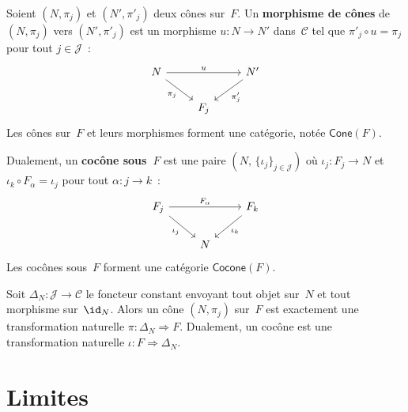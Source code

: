\begin{definition}\label{def:morphisme-cone}
Soient $(N,\pi_j)$ et $(N',\pi'_j)$ deux cônes sur~$F$.
Un \textbf{morphisme de cônes} de $(N,\pi_j)$ vers $(N',\pi'_j)$
est un morphisme $u\colon N\to N'$ dans~$\mathcal{C}$ tel que
$\pi'_j \circ u = \pi_j$ pour tout $j\in\mathcal{J}$~:
\[
\begin{tikzcd}
N \arrow[rr, "u"] \arrow[dr, "\pi_j"'] && N' \arrow[dl, "\pi'_j"] \\
& F_j &
\end{tikzcd}
\]
Les cônes sur~$F$ et leurs morphismes forment une catégorie,
notée $\mathsf{Cone}(F)$.
\end{definition}

\begin{definition}[Cocône]\label{def:cocone}
Dualement, un \textbf{cocône sous~$F$} est une paire
$(N,\,\{\iota_j\}_{j\in\mathcal{J}})$ où $\iota_j\colon F_j\to N$
et $\iota_k \circ F_\alpha = \iota_j$ pour tout $\alpha\colon j\to k$~:
\[
\begin{tikzcd}
F_j \arrow[rr, "F_\alpha"] \arrow[dr, "\iota_j"'] & & F_k \arrow[dl, "\iota_k"] \\
& N &
\end{tikzcd}
\]
Les cocônes sous~$F$ forment une catégorie $\mathsf{Cocone}(F)$.
\end{definition}

\begin{remarque}\label{rem:cone-transfo-nat}
Soit $\Delta_N \colon \mathcal{J}\to\mathcal{C}$ le foncteur constant
envoyant tout objet sur~$N$ et tout morphisme sur~$\id_N$.
Alors un cône $(N,\pi_j)$ sur~$F$ est exactement une transformation naturelle
$\pi\colon \Delta_N \Rightarrow F$.
Dualement, un cocône est une transformation naturelle $\iota\colon F\Rightarrow\Delta_N$.
\end{remarque}


\section{Limites}\label{sec:limites}

